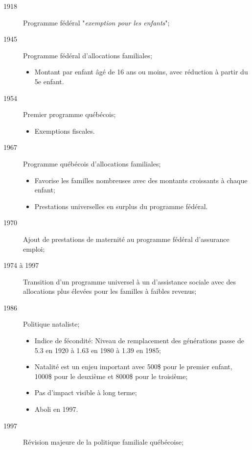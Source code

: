 \documentclass[10pt, french]{article}
\begin{document}
\begin{multicols*}{3}
\begin{description}
	\item[1918]	Programme \textcolor{bulgarianrose}{fédéral} "\textit{exemption pour les enfants}";
	\item[1945]	Programme \textcolor{bulgarianrose}{fédéral} d'allocations familiales;
		\begin{itemize}[leftmargin = *]
		\item	Montant par enfant âgé de 16 ans ou moins, avec réduction à partir du 5e enfant.
		\end{itemize}
	\item[1954]	Premier programme \textcolor{blue(pigment)}{québécois};
		\begin{itemize}[leftmargin = *]
		\item	Exemptions fiscales.
		\end{itemize}
	\item[1967]	Programme \textcolor{blue(pigment)}{québécois} d'allocations familiales;
		\begin{itemize}[leftmargin = *]
		\item	Favorise les familles nombreuses avec des montants croissants à chaque enfant;
		\item	Prestations universelles en surplus du programme \textcolor{bulgarianrose}{fédéral}.
		\end{itemize}
	\item[1970]	Ajout de prestations de maternité au programme \textcolor{bulgarianrose}{fédéral} d'assurance emploi;
	\item[1974 à 1997]	Transition d'un programme universel à un d'assistance sociale avec des allocations plus élevées pour les familles à faibles revenus;
	\item[1986]	Politique nataliste;
		\begin{itemize}[leftmargin = *]
		\item	Indice de fécondité: Niveau de remplacement des générations passe de 5.3 en 1920 à 1.63 en 1980 à 1.39 en 1985;
		\item	Natalité est un enjeu important avec 500\$ pour le premier enfant, 1000\$ pour le deuxième et 8000\$ pour le troisième;
		\item	Pas d'impact visible à long terme;
		\item	Aboli en 1997.
		\end{itemize}
	\item[1997]	Révision majeure de la politique familiale \textcolor{blue(pigment)}{québécoise};
		\begin{itemize}[leftmargin = *]

\end{itemize}
\end{description}
\end{multicols*}
\end{document}
